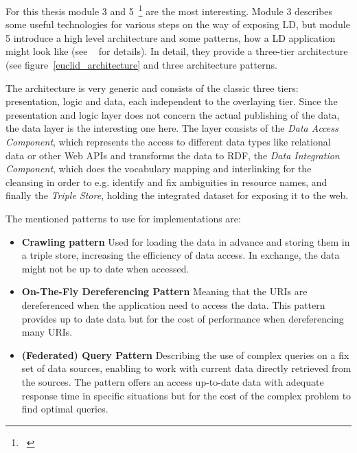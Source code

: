 For this thesis module 3 and 5~\footnote{~\cite{euclid:chap5}} are the most interesting. Module 3 describes some useful technologies for various steps on the way of exposing LD, but module 5 introduce a high level architecture and some patterns, how a LD application might look like (see ~\cite{euclid:chap5} for details). In detail, they provide a three-tier architecture (see figure~\ref{euclid_architecture} and three architecture patterns.

The architecture is very generic and consists of the classic three tiers: presentation, logic and data, each independent to the overlaying tier. Since the presentation and logic layer does not concern the actual publishing of the data, the data layer is the interesting one here. The layer consists of the \emph{Data Access Component}, which represents the access to different data types like relational data or other Web APIs and transforms the data to RDF, the \emph{Data Integration Component}, which does the vocabulary mapping and interlinking for the cleansing in order to e.g. identify and fix ambiguities in resource names, and finally the \emph{Triple Store}, holding the integrated dataset for exposing it to the web.

The mentioned patterns to use for implementations are:

\begin{itemize}

\item \textbf{Crawling pattern}
Used for loading the data in advance and storing them in a triple store, increasing the efficiency of data access. In exchange, the data might not be up to date when accessed.

\item \textbf{On-The-Fly Dereferencing Pattern}
Meaning that the URIs are dereferenced when the application need to access the data. This pattern provides up to date data but for the cost of performance when dereferencing many URIs.

\item \textbf{(Federated) Query Pattern}
Describing the use of complex queries on a fix set of data sources, enabling to work with current data directly retrieved from the sources. The pattern offers an access up-to-date data with adequate response time in specific situations but for the cost of the complex problem to find optimal queries.
\end{itemize}


